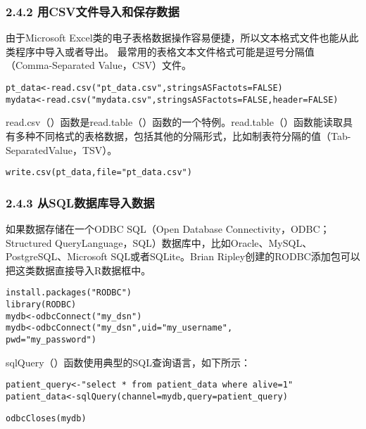 \documentclass[11pt]{article}
\begin{document}
\subsubsection{2.4.2 用CSV文件导入和保存数据}
\label{sec:org7728727}
由于Microsoft Excel类的电子表格数据操作容易便捷，所以文本格式文件也能从此类程序中导入或者导出。
最常用的表格文本文件格式可能是逗号分隔值（Comma-Separated Value，CSV）文件。

\begin{verbatim}
pt_data<-read.csv("pt_data.csv",stringsASFactots=FALSE)
mydata<-read.csv("mydata.csv",stringsASFactots=FALSE,header=FALSE)
\end{verbatim}
read.csv（）函数是read.table（）函数的一个特例。read.table（）函数能读取具有多种不同格式的表格数据，包括其他的分隔形式，比如制表符分隔的值（Tab-SeparatedValue，TSV）。
\begin{verbatim}
write.csv(pt_data,file="pt_data.csv")
\end{verbatim}
\subsubsection{2.4.3 从SQL数据库导入数据}
\label{sec:org4907458}
如果数据存储在一个ODBC SQL（Open Database Connectivity，ODBC；Structured QueryLanguage，SQL）数据库中，比如Oracle、MySQL、PostgreSQL、Microsoft SQL或者SQLite。Brian Ripley创建的RODBC添加包可以把这类数据直接导入R数据框中。
\begin{verbatim}
install.packages("RODBC")
library(RODBC)
mydb<-odbcConnect("my_dsn")
mydb<-odbcConnect("my_dsn",uid="my_username",
pwd="my_password")
\end{verbatim}
sqlQuery（）函数使用典型的SQL查询语言，如下所示：
\begin{verbatim}
patient_query<-"select * from patient_data where alive=1"
patient_data<-sqlQuery(channel=mydb,query=patient_query)
\end{verbatim}
\begin{verbatim}
odbcCloses(mydb)
\end{verbatim}
\end{document}
